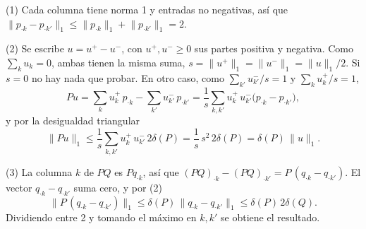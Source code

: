 \begin{demostracion}
(1) Cada columna tiene norma 1 y entradas no negativas, así que $\lVert p_{\cdot k} - p_{\cdot k'} \rVert_1 \leq \lVert p_{\cdot k} \rVert_1 + \lVert p_{\cdot k'} \rVert_1 = 2$.

(2) Se escribe $u = u^{+} - u^{-}$, con $u^{+}, u^{-} \geq 0$ sus partes positiva y negativa. Como $\sum_k u_k = 0$, ambas tienen la misma suma, $s = \lVert u^{+} \rVert_1 = \lVert u^{-} \rVert_1 = \lVert u \rVert_1 / 2$. Si $s = 0$ no hay nada que probar. En otro caso, como $\sum_{k'} u^{-}_{k'} / s = 1$ y $\sum_{k} u^{+}_{k} / s = 1$,
\[
  P u = \sum_{k} u^{+}_{k}\, p_{\cdot k} - \sum_{k'} u^{-}_{k'}\, p_{\cdot k'}
      = \frac{1}{s} \sum_{k, k'} u^{+}_{k}\, u^{-}_{k'} \bigl(p_{\cdot k} - p_{\cdot k'}\bigr),
\]
y por la desigualdad triangular
\[
  \lVert P u \rVert_1 \leq \frac{1}{s} \sum_{k, k'} u^{+}_{k}\, u^{-}_{k'}\, 2\delta(P)
  = \frac{1}{s}\, s^2\, 2 \delta(P) = \delta(P)\, \lVert u \rVert_1 .
\]

(3) La columna $k$ de $PQ$ es $P q_{\cdot k}$, así que $(PQ)_{\cdot k} - (PQ)_{\cdot k'} = P\,(q_{\cdot k} - q_{\cdot k'})$. El vector $q_{\cdot k} - q_{\cdot k'}$ suma cero, y por (2)
\[
  \bigl\lVert P\,(q_{\cdot k} - q_{\cdot k'}) \bigr\rVert_1 \leq \delta(P)\, \bigl\lVert q_{\cdot k} - q_{\cdot k'} \bigr\rVert_1 \leq \delta(P)\, 2 \delta(Q).
\]
Dividiendo entre 2 y tomando el máximo en $k, k'$ se obtiene el resultado.
\end{demostracion}

\endinput
